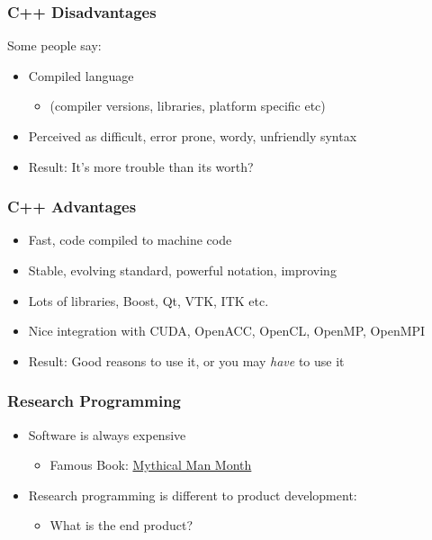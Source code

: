 \subsubsection{C++ Disadvantages}\label{c-disadvantages}

Some people say:

\begin{itemize}
\itemsep1pt\parskip0pt
\item
  Compiled language

  \begin{itemize}
  \itemsep1pt\parskip0pt
  \item
    (compiler versions, libraries, platform specific etc)
  \end{itemize}
\item
  Perceived as difficult, error prone, wordy, unfriendly syntax
\item
  Result: It's more trouble than its worth?
\end{itemize}

\subsubsection{C++ Advantages}\label{c-advantages}

\begin{itemize}
\itemsep1pt\parskip0pt
\item
  Fast, code compiled to machine code
\item
  Stable, evolving standard, powerful notation, improving
\item
  Lots of libraries, Boost, Qt, VTK, ITK etc.
\item
  Nice integration with CUDA, OpenACC, OpenCL, OpenMP, OpenMPI
\item
  Result: Good reasons to use it, or you may \emph{have} to use it
\end{itemize}

\subsubsection{Research Programming}\label{research-programming}

\begin{itemize}
\itemsep1pt\parskip0pt
\item
  Software is always expensive

  \begin{itemize}
  \itemsep1pt\parskip0pt
  \item
    Famous Book:
    \href{http://www.amazon.co.uk/Mythical-Man-month-Essays-Software-Engineering/dp/0201835959/ref=sr_1_1?ie=UTF8\&qid=1452507457\&sr=8-1\&keywords=mythical+man+month}{Mythical
    Man Month}
  \end{itemize}
\item
  Research programming is different to product development:

  \begin{itemize}
  \itemsep1pt\parskip0pt
  \item
    What is the end product?
  \end{itemize}
\end{itemize}

